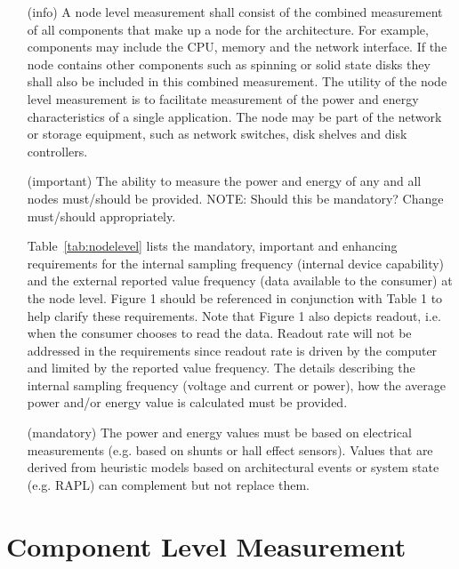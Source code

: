 \begin{itemize}

\item[(info)]
A node level measurement shall consist of the combined measurement of all components that make up a node for the architecture. For example, components may include the CPU, memory and the network interface. If the node contains other components such as spinning or solid state disks they shall also be included in this combined measurement. The utility of the node level measurement is to facilitate measurement of the power and energy characteristics of a single application. The node may be part of the network or storage equipment, such as network switches, disk shelves and disk controllers.   

\item[(important)]
The ability to measure the power and energy of any and all nodes must/should be provided.  NOTE: Should this be mandatory? Change must/should appropriately.

	Table~\ref{tab:nodelevel} lists the mandatory, important and enhancing requirements for the internal sampling frequency (internal device capability) and the external reported value frequency (data available to the consumer) at the node level. Figure 1 should be referenced in conjunction with Table 1 to help clarify these requirements. Note that Figure 1 also depicts readout, i.e. when the consumer chooses to read the data. Readout rate will not be addressed in the requirements since readout rate is driven by the computer and limited by the reported value frequency. The details describing the internal sampling frequency (voltage and current or power), how the average power and/or energy value is calculated must be provided.

\item[(mandatory)]
The power and energy values must be based on electrical measurements (e.g. based on shunts or hall effect sensors). Values that are derived from heuristic models based on architectural events or system state (e.g. RAPL) can complement but not replace them.
\end{itemize}


\section{Component Level Measurement}


